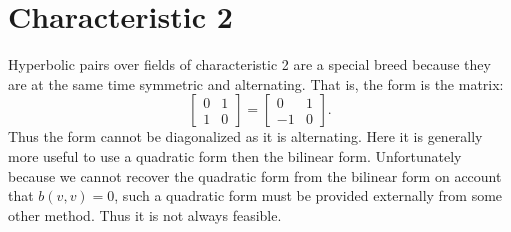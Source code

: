 \documentclass[12pt]{article}
\begin{document}
\section{Characteristic 2}

Hyperbolic pairs over fields of characteristic 2 are a special breed because they 
are at the same time symmetric and alternating.  That is, the form
is the matrix:
\[\begin{bmatrix} 0 & 1\\ 1 & 0\end{bmatrix}=\begin{bmatrix} 0 & 1 \\ -1 & 0
\end{bmatrix}.\]
Thus the form cannot be diagonalized as it is alternating.  Here it is generally 
more useful to use a quadratic form then the bilinear form.  Unfortunately
because we cannot recover the quadratic form from the bilinear form
on account that $b(v,v)=0$, such a quadratic form must be provided externally
from some other method.  Thus it is not always feasible.

\end{document}
